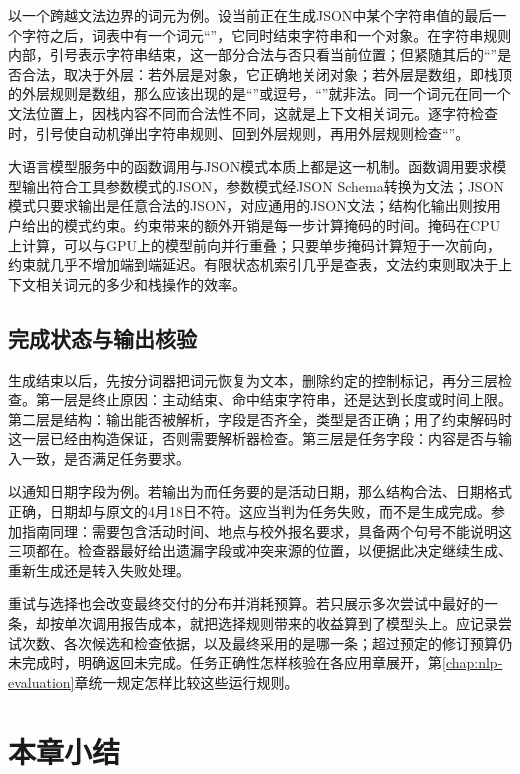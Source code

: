 以一个跨越文法边界的词元为例。设当前正在生成JSON中某个字符串值的最后一个字符之后，词表中有一个词元“”，它同时结束字符串和一个对象。在字符串规则内部，引号表示字符串结束，这一部分合法与否只看当前位置；但紧随其后的“\code{\}}”是否合法，取决于外层：若外层是对象，它正确地关闭对象；若外层是数组，即栈顶的外层规则是数组，那么应该出现的是“\code{]}”或逗号，“”就非法。同一个词元在同一个文法位置上，因栈内容不同而合法性不同，这就是上下文相关词元。逐字符检查时，引号使自动机弹出字符串规则、回到外层规则，再用外层规则检查“\code{\}}”。

大语言模型服务中的函数调用与JSON模式本质上都是这一机制。函数调用要求模型输出符合工具参数模式的JSON，参数模式经JSON Schema转换为文法；JSON模式只要求输出是任意合法的JSON，对应通用的JSON文法；结构化输出则按用户给出的模式约束。约束带来的额外开销是每一步计算掩码的时间。掩码在CPU上计算，可以与GPU上的模型前向并行重叠；只要单步掩码计算短于一次前向，约束就几乎不增加端到端延迟。有限状态机索引几乎是查表，文法约束则取决于上下文相关词元的多少和栈操作的效率。

\subsection{完成状态与输出核验}
\label{sec:nlp-inference-output-check}

生成结束以后，先按分词器把词元恢复为文本，删除约定的控制标记，再分三层检查。第一层是终止原因：主动结束、命中结束字符串，还是达到长度或时间上限。第二层是结构：输出能否被解析，字段是否齐全，类型是否正确；用了约束解码时这一层已经由构造保证，否则需要解析器检查。第三层是任务字段：内容是否与输入一致，是否满足任务要求。

以通知日期字段为例。若输出为而任务要的是活动日期，那么结构合法、日期格式正确，日期却与原文的4月18日不符。这应当判为任务失败，而不是生成完成。参加指南同理：需要包含活动时间、地点与校外报名要求，具备两个句号不能说明这三项都在。检查器最好给出遗漏字段或冲突来源的位置，以便据此决定继续生成、重新生成还是转入失败处理。

重试与选择也会改变最终交付的分布并消耗预算。若只展示多次尝试中最好的一条，却按单次调用报告成本，就把选择规则带来的收益算到了模型头上。应记录尝试次数、各次候选和检查依据，以及最终采用的是哪一条；超过预定的修订预算仍未完成时，明确返回未完成。任务正确性怎样核验在各应用章展开，第\ref{chap:nlp-evaluation}章统一规定怎样比较这些运行规则。

\section{本章小结}
\label{sec:nlp-inference-summary}


